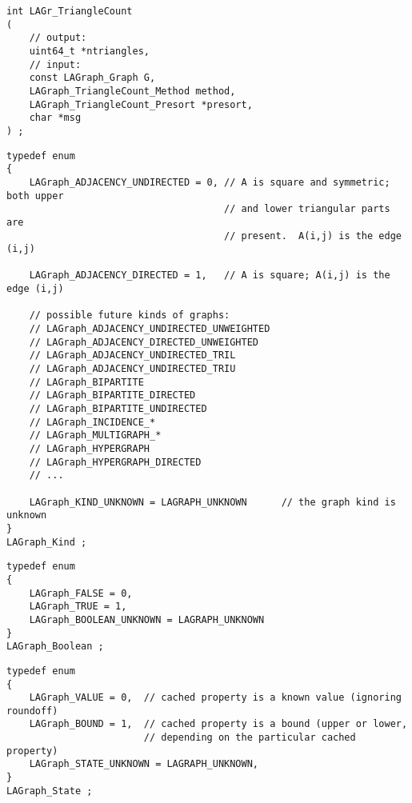 \begin{verbatim}
int LAGr_TriangleCount
(
    // output:
    uint64_t *ntriangles,
    // input:
    const LAGraph_Graph G,
    LAGraph_TriangleCount_Method method,
    LAGraph_TriangleCount_Presort *presort,
    char *msg
) ;
\end{verbatim}




\begin{verbatim}
typedef enum
{
    LAGraph_ADJACENCY_UNDIRECTED = 0, // A is square and symmetric; both upper
                                      // and lower triangular parts are
                                      // present.  A(i,j) is the edge (i,j)

    LAGraph_ADJACENCY_DIRECTED = 1,   // A is square; A(i,j) is the edge (i,j)

    // possible future kinds of graphs:
    // LAGraph_ADJACENCY_UNDIRECTED_UNWEIGHTED
    // LAGraph_ADJACENCY_DIRECTED_UNWEIGHTED
    // LAGraph_ADJACENCY_UNDIRECTED_TRIL
    // LAGraph_ADJACENCY_UNDIRECTED_TRIU
    // LAGraph_BIPARTITE
    // LAGraph_BIPARTITE_DIRECTED
    // LAGraph_BIPARTITE_UNDIRECTED
    // LAGraph_INCIDENCE_*
    // LAGraph_MULTIGRAPH_*
    // LAGraph_HYPERGRAPH
    // LAGraph_HYPERGRAPH_DIRECTED
    // ...

    LAGraph_KIND_UNKNOWN = LAGRAPH_UNKNOWN      // the graph kind is unknown
}
LAGraph_Kind ;
\end{verbatim}




\begin{verbatim}
typedef enum
{
    LAGraph_FALSE = 0,
    LAGraph_TRUE = 1,
    LAGraph_BOOLEAN_UNKNOWN = LAGRAPH_UNKNOWN
}
LAGraph_Boolean ;
\end{verbatim}




\begin{verbatim}
typedef enum
{
    LAGraph_VALUE = 0,  // cached property is a known value (ignoring roundoff)
    LAGraph_BOUND = 1,  // cached property is a bound (upper or lower,
                        // depending on the particular cached property)
    LAGraph_STATE_UNKNOWN = LAGRAPH_UNKNOWN,
}
LAGraph_State ;
\end{verbatim}




